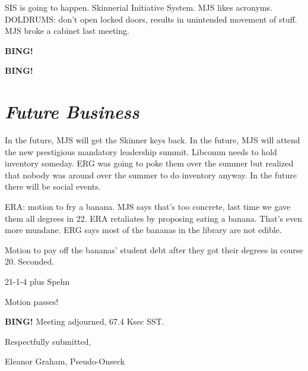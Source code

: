 \documentclass[10pt]{article}
\newcommand{\bing}{{\bf BING!} }
\newcommand{\goto}[1]{\bing \vskip 12pt \section*{{\em{#1}}}}
\newcommand{\ps}{ plus Spehn\xspace}
\newcommand{\onseck}{Eleanor Graham, Pseudo-Onseck}
\begin{document}
SIS is going to happen. Skinnerial Initiative System. MJS likes acronyms. DOLDRUMS: don't open locked doors, results in unintended movement of stuff. MJS broke a cabinet last meeting. 

\bing

\goto{Future Business}

In the future, MJS will get the Skinner keys back. In the future, MJS will attend the new prestigious mandatory leadership summit. Libcomm needs to hold inventory someday. ERG was going to poke them over the summer but realized that nobody was around over the summer to do inventory anyway. In the future there will be social events.

ERA: motion to fry a banana. MJS says that's too concrete, last time we gave them all degrees in 22. ERA retaliates by proposing eating a banana. That's even more mundane. ERG says most of the bananas in the library are not edible. 

Motion to pay off the bananas' student debt after they got their degrees in course 20. Seconded.

21-1-4\ps

Motion passes!

\bing
\noindent
Meeting adjourned, 67.4 Ksec SST.

\vspace{18pt}

\centerline{Respectfully submitted,}
\centerline{\onseck}
\end{document}
